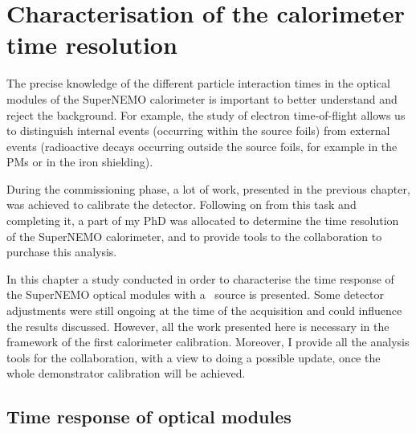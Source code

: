 \chapter{Characterisation of the calorimeter time resolution}
\label{ch:Cobalt_study}

The precise knowledge of the different particle interaction times in the optical modules of the SuperNEMO calorimeter is important to better understand and reject the background.
For example, the study of electron time-of-flight allows us to distinguish internal events (occurring within the source foils) from external events (radioactive decays occurring outside the source foils, for example in the PMs or in the iron shielding).

During the commissioning phase, a lot of work, presented in the previous chapter, was achieved to calibrate the detector.
Following on from this task and completing it, a part of my PhD was allocated to determine the time resolution of the SuperNEMO calorimeter, and to provide tools to the collaboration to purchase this analysis.

In this chapter a study conducted in order to characterise the time response of the SuperNEMO optical modules with a \Co\ source is presented.
Some detector adjustments were still ongoing at the time of the acquisition and could influence the results discussed.
However, all the work presented here is necessary in the framework of the first calorimeter calibration.
Moreover, I provide all the analysis tools for the collaboration, with a view to doing a possible update, once the whole demonstrator calibration will be achieved.



\section{Time response of optical modules}
\label{subsec:OMtimeResponse}

